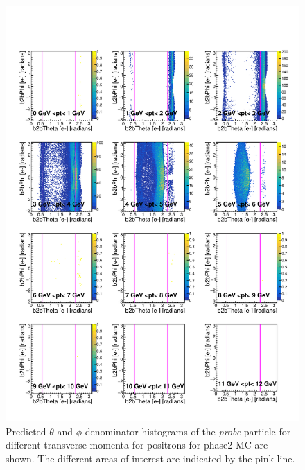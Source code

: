 \documentclass[a4paper,11pt,twosided,final,german,openbib,pdftex,listof=totoc,bibliography=totoc]{scrbook}
\begin{document}
\begin{appendix}
\begin{figure}[h!]
	\includegraphics[width=\textwidth]{Plots/master/RTPtMepE_MC.pdf}
	\caption[Enumerator $\theta$-$\phi$ Positron Transverse Momentum Phase2 MC]{Predicted $\theta$ and $\phi$ denominator histograms of the \textit{probe} particle for different transverse momenta for positrons for phase2 MC are shown. The different areas of interest are indicated by the pink line.}
	\label{plt:RTtPMepD_MC}
\end{figure}


\end{appendix}
\end{document}
